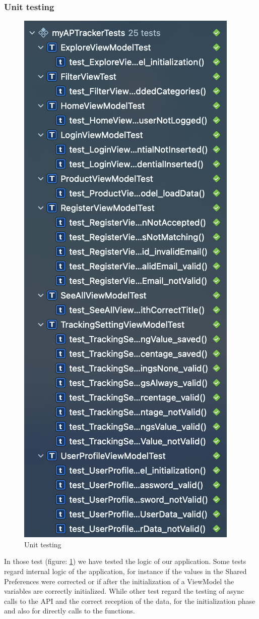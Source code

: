 \subsubsection{Unit testing}
\begin{figure}[h!]
        \centering
        \includegraphics[scale=0.40]{images/testing/unit_testing.png}
        \caption{Unit testing}
        \label{fig:unit_testing}
\end{figure}
\FloatBarrier
In those test (figure: \ref{fig:unit_testing}) we have tested the logic of our application.
Some tests regard internal logic of the application, for instance if the values in the Shared Preferences were corrected or if after the initialization of a ViewModel the variables are correctly initialized.
While other test regard the testing of async calls to the API and the correct reception of the data, for the initialization phase and also for directly calls to the functions.

